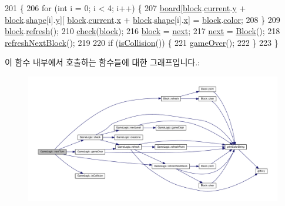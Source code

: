 \begin{DoxyCode}
201                          \{
206     \textcolor{keywordflow}{for} (\textcolor{keywordtype}{int} i = 0; i < 4; i++) \{
207         \hyperlink{class_game_logic_a71071a20595279a580d18dfa60ed4a1c}{board}[\hyperlink{class_game_logic_a499d9b05317bb6a77bf3521f42a6638a}{block}.\hyperlink{class_block_aeb5dd312b719966752ba4b38720a4535}{current}.\hyperlink{struct_point_a2e1b5fb2b2a83571f5c0bc0f66a73cf7}{y} + \hyperlink{class_game_logic_a499d9b05317bb6a77bf3521f42a6638a}{block}.\hyperlink{class_block_ae1a4e97236e1e5f04d21fc9227b8c3a8}{shape}[i].\hyperlink{struct_point_a2e1b5fb2b2a83571f5c0bc0f66a73cf7}{y}][
      \hyperlink{class_game_logic_a499d9b05317bb6a77bf3521f42a6638a}{block}.\hyperlink{class_block_aeb5dd312b719966752ba4b38720a4535}{current}.\hyperlink{struct_point_a8c779e11e694b20e0946105a9f5de842}{x} + \hyperlink{class_game_logic_a499d9b05317bb6a77bf3521f42a6638a}{block}.\hyperlink{class_block_ae1a4e97236e1e5f04d21fc9227b8c3a8}{shape}[i].\hyperlink{struct_point_a8c779e11e694b20e0946105a9f5de842}{x}] = \hyperlink{class_game_logic_a499d9b05317bb6a77bf3521f42a6638a}{block}.\hyperlink{class_block_a11fa34418f20b6613d0ceeea8fc71d25}{color};
208     \}
209     \hyperlink{class_game_logic_a499d9b05317bb6a77bf3521f42a6638a}{block}.\hyperlink{class_block_a24e9792df444cc3cd9cd9c28a62f5abd}{refresh}();
210     \hyperlink{class_game_logic_afabf48aab0520a7ecd576bfc178d4767}{check}(\hyperlink{class_game_logic_a499d9b05317bb6a77bf3521f42a6638a}{block});
216     \hyperlink{class_game_logic_a499d9b05317bb6a77bf3521f42a6638a}{block} = \hyperlink{class_game_logic_a42f7be1948bf9cf0a8ff05d7544f62bc}{next};
217     \hyperlink{class_game_logic_a42f7be1948bf9cf0a8ff05d7544f62bc}{next} = \hyperlink{class_block}{Block}();
218     \hyperlink{class_game_logic_a81fa5e44fb6dc431c926f7c3fd0b7cdb}{refreshNextBlock}();
219 
220     \textcolor{keywordflow}{if} (\hyperlink{class_game_logic_a1c534033fe42c8af4fb0e11e3fed2cfa}{isCollision}()) \{
221         \hyperlink{class_game_logic_af6ba400e79f01e5c59f48f55273894e6}{gameOver}();
222     \}
223 \}
\end{DoxyCode}


이 함수 내부에서 호출하는 함수들에 대한 그래프입니다.\+:
\nopagebreak
\begin{figure}[H]
\begin{center}
\leavevmode
\includegraphics[width=350pt]{class_game_logic_a70b7fcd97d321dfb9d2130f864ddac3b_cgraph}
\end{center}
\end{figure}




